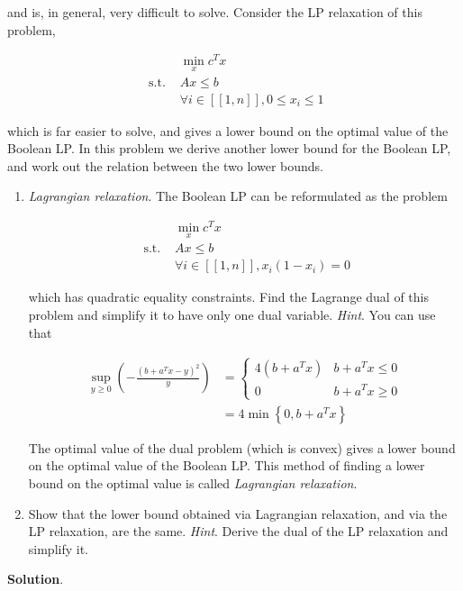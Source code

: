 \documentclass[a4paper, 11pt]{report}
\begin{document}
\noindent and is, in general, very difficult to solve. Consider the LP relaxation of this problem,

\begin{equation*}
    \begin{aligned}
    & \min_{x} c^{T} x \\
    \text{ s.t. } & A x \leq b \\
    & \forall i \in [\![ 1, n ]\!], 0 \leq x_{i} \leq 1
    \end{aligned}
\end{equation*}

\noindent which is far easier to solve, and gives a lower bound on the optimal value of the Boolean LP. In this problem we derive another lower bound for the Boolean LP, and work out the relation between the two lower bounds.

\begin{enumerate}
    \item \emph{Lagrangian relaxation}. The Boolean LP can be reformulated as the problem
    
    \begin{equation*}
        \begin{aligned}
        & \min_{x} c^{T} x \\
        \text{ s.t. } & A x \leq b \\
        & \forall i \in [\![ 1, n ]\!], x_{i} \left( 1 - x_{i} \right) = 0
        \end{aligned}
    \end{equation*}
    
    \noindent which has quadratic equality constraints. Find the Lagrange dual of this problem and simplify it to have only one dual variable. \textit{Hint}. You can use that
    
    \begin{equation*}
        \begin{aligned}
        \sup_{y \geq 0} \left( - \frac{\left( b + a^{T} x - y \right)^{2}}{y} \right) &= \begin{cases}
        4 \left( b + a^{T} x \right) & b + a^{T} x \leq 0 \\
        0 & b + a^{T} x \geq 0
        \end{cases} \\
        &= 4 \min \left\{ 0, b + a^{T} x \right\}
        \end{aligned}
    \end{equation*}
    
    \noindent The optimal value of the dual problem (which is convex) gives a lower bound on the optimal value of the Boolean LP. This method of finding a lower bound on the optimal value is called \emph{Lagrangian relaxation}.
    
    \item Show that the lower bound obtained via Lagrangian relaxation, and via the LP relaxation, are the same. \textit{Hint}. Derive the dual of the LP relaxation and simplify it.
\end{enumerate}

\noindent \textbf{Solution}.
\end{document}
